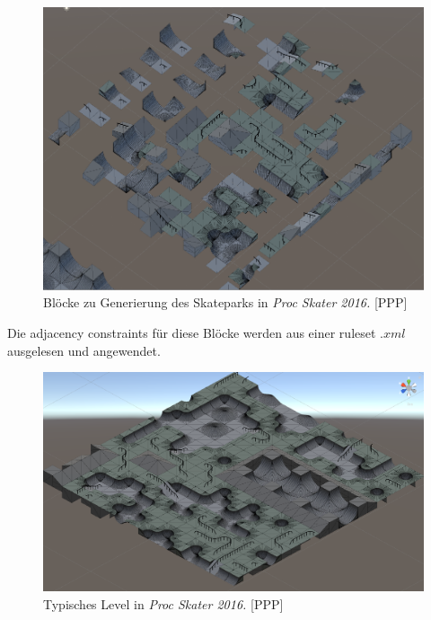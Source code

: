 \documentclass[12pt, a4paper,twoside,openright]{report}
\begin{document}
\begin{figure}[H]
    \centering
    \includegraphics[width=1\linewidth]{images/proc-skater-ruleset.png}%
    \caption{Blöcke zu Generierung des Skateparks in \textit{Proc Skater 2016.} {[PPP]}}%
\end{figure}

Die adjacency constraints für diese Blöcke werden aus einer ruleset $.xml$ ausgelesen und angewendet.

\begin{figure}[H]
    \centering
    \includegraphics[width=1\linewidth]{images/proc-skate-level.png}%
    \caption{Typisches Level in \textit{Proc Skater 2016.} {[PPP]}}%
\end{figure}
\end{document}
